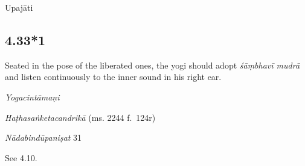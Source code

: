 \begin{ekdosis}

\begin{metre}[hp04_033]
Upajāti
\end{metre}

\subsection*{4.33*1}
\begin{translation}[hp04_033_1]
Seated in the pose of the liberated ones, the yogi should adopt \emph{śāṃbhavī mudrā} and listen continuously to the inner sound in his right ear.
\end{translation}
%


\begin{testimonia}[hp04_033_1]
\emph{Yogacintāmaṇi}
\begin{versinnote}
\end{versinnote}

\emph{Haṭhasaṅketacandrikā} (ms. 2244 f.~124r)
\begin{versinnote}
\tl{\var{dakṣiṇe karṇe ] B220,  dakṣirṇe 2244}\\+}
\tl{\var{ekāṃtike ] 2244, ekāṃtate B220}\\!}
\end{versinnote}

\emph{Nādabindūpaniṣat} 31
\begin{versinnote}
\end{versinnote}
\end{testimonia}

\begin{philcomm}[hp04_033_1]
See 4.10.
\end{philcomm}


\end{ekdosis}
